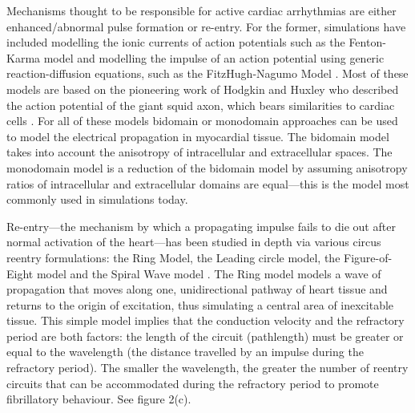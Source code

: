 \documentclass[twocolumn, a1paper]{article}
\begin{document}
Mechanisms thought to be responsible for active cardiac arrhythmias are either enhanced/abnormal pulse formation or re-entry. For the former, simulations have included modelling the ionic currents of action potentials such as the Fenton-Karma model \cite{Grandi} \cite{Fenton} and modelling the impulse of an action potential using generic reaction-diffusion equations, such as the FitzHugh-Nagumo Model \cite{FitzHugh}. Most of these models are based on the pioneering work of Hodgkin and Huxley who described the action potential of the giant squid axon, which bears similarities to cardiac cells \cite{Hodgkin}. %
 For all of these models bidomain or monodomain approaches can be used to model the electrical propagation in myocardial tissue. %
  The bidomain model takes into account the anisotropy of intracellular and extracellular spaces. The monodomain model is a reduction of the bidomain model by assuming anisotropy ratios of intracellular and extracellular domains are equal---this is the model most commonly used in simulations today.%

Re-entry---the mechanism by which a propagating impulse fails to die out after normal activation of the heart---has been studied in depth via various circus reentry formulations: the Ring Model, the Leading circle model, the Figure-of-Eight model and the Spiral Wave model \cite{Antze} \cite{Tusscher}. The Ring model models a wave of propagation that moves along one, unidirectional pathway of heart tissue and returns to the origin of excitation, thus simulating a central area of inexcitable tissue. This simple model implies that the conduction velocity and the refractory period are both factors: the length of the circuit (pathlength) must be greater or equal to the wavelength (the distance travelled by an impulse during the refractory period). The smaller the wavelength, the greater the number of reentry circuits that can be accommodated during the refractory period to promote fibrillatory behaviour. See figure 2(c).
\end{document}
